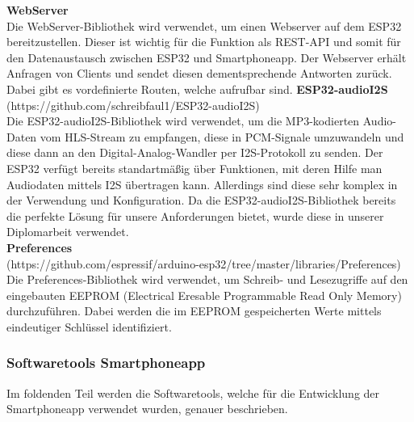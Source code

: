 \documentclass[]{article}
\begin{document}
\vspace{4mm}\newline
\textbf{WebServer} \\
Die WebServer-Bibliothek wird verwendet, um einen Webserver auf dem ESP32 bereitzustellen. Dieser ist wichtig für die Funktion als REST-API und somit für den Datenaustausch zwischen ESP32 und Smartphoneapp. Der Webserver erhält Anfragen von Clients und sendet diesen dementsprechende Antworten zurück. Dabei gibt es vordefinierte Routen, welche aufrufbar sind.
\vspace{4mm}\newline
\textbf{ESP32-audioI2S} \\
(https://github.com/schreibfaul1/ESP32-audioI2S) \\
Die ESP32-audioI2S-Bibliothek wird verwendet, um die MP3-kodierten Audio-Daten vom HLS-Stream zu empfangen, diese in PCM-Signale umzuwandeln und diese dann an den Digital-Analog-Wandler per I2S-Protokoll zu senden. Der ESP32 verfügt bereits standartmäßig über Funktionen, mit deren Hilfe man Audiodaten mittels I2S übertragen kann. Allerdings sind diese sehr komplex in der Verwendung und Konfiguration. Da die ESP32-audioI2S-Bibliothek bereits die perfekte Lösung für unsere Anforderungen bietet, wurde diese in unserer Diplomarbeit verwendet. \newline \\
\textbf{Preferences} \\
(https://github.com/espressif/arduino-esp32/tree/master/libraries/Preferences)
Die Preferences-Bibliothek wird verwendet, um Schreib- und Lesezugriffe auf den eingebauten EEPROM (Electrical Eresable Programmable Read Only Memory) durchzuführen. Dabei werden die im EEPROM gespeicherten Werte mittels eindeutiger Schlüssel identifiziert.
\subsubsection{Softwaretools Smartphoneapp}
Im foldenden Teil werden die Softwaretools, welche für die Entwicklung der Smartphoneapp verwendet wurden, genauer beschrieben. \\
\end{document}
